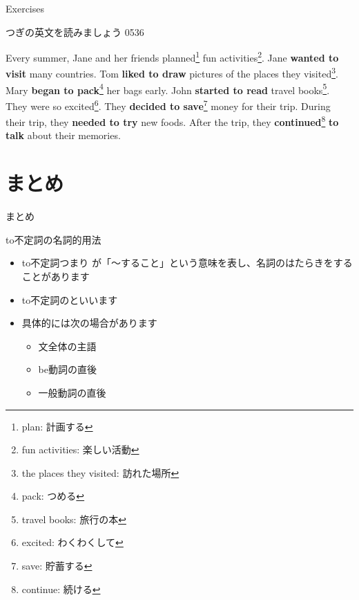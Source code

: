\documentclass[aspectratio=169,xcolor={dvipsnames,table}]{beamer}
\begin{document}
\begin{frame}[plain]{Exercises}

{\small つぎの英文を読みましょう}%
\hfill{\tiny 0536}\,{\scriptsize {}}

Every summer, Jane and her friends planned\footnote{plan: 計画する} fun activities\footnote{fun activities: 楽しい活動}.
Jane {\bfseries wanted to visit} many countries.
Tom {\bfseries liked to draw} pictures of the places they visited\footnote{the places they visited: 訪れた場所}.
Mary {\bfseries began to pack}\footnote{pack: つめる} her bags early.
John {\bfseries started to read} travel books\footnote{travel books: 旅行の本}.
They were so excited\footnote{excited: わくわくして}.
They {\bfseries decided to save}\footnote{save: 貯蓄する} money for their trip.
During their trip, they {\bfseries needed to try} new foods.
After the trip, they { \bfseries continued}\footnote{continue: 続ける} {\bfseries to talk} about their memories.
\end{frame}
\section{まとめ}
\begin{frame}[plain]{まとめ}
 
\begin{block}{to不定詞の名詞的用法}
\begin{itemize}[square]\small
 \item  to不定詞つまり\,\,が「～すること」という意味を表し、名詞のはたらきをすることがあります
 \item to不定詞のといいます
 \item 具体的には次の場合があります
      \begin{itemize}[circle]
       \item 文全体の主語
       \item be動詞の直後
       \item 一般動詞の直後
      \end{itemize}
 \end{itemize}
     \end{block}
\end{frame}
\end{document}
